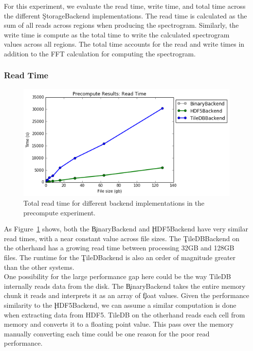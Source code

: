 For this experiment, we evaluate the read time, write time, and total time
across the different \c{StorageBackend} implementations. The read time is
calculated as the sum of all reads across regions when producing the
spectrogram. Similarly, the write time is compute as the total time to write
the calculated spectrogram values across all regions. The total time accounts
for the read and write times in addition to the FFT calculation for computing
the spectrogram.

\subsubsection{Read Time}

\begin{figure}[h]
\begin{center}
\includegraphics[scale=0.75]{./img/precompute-exp-read-time.png}
\caption{Total read time for different backend implementations in the
  precompute experiment.}
\label{fig:precompute-exp-read-time}
\end{center}
\end{figure}

As Figure~\ref{fig:precompute-exp-read-time} shows, both the \c{BinaryBackend}
and \c{HDF5Backend} have very similar read times, with a near constant value
across file sizes. The \c{TileDBBackend} on the otherhand has a growing read
time between processing 32GB and 128GB files. The runtime for the
\c{TileDBackend} is also an order of magnitude greater than the other systems. \\

One possibility for the large performance gap here could be the way TileDB
internally reads data from the disk. The \c{BinaryBackend} takes the entire
memory chunk it reads and interprets it as an array of \c{float} values. Given
the performance similarity to the \c{HDF5Backend}, we can assume a similar
computation is done when extracting data from HDF5. TileDB on the otherhand
reads each cell from memory and converts it to a floating point value. This
pass over the memory manually converting each time could be one reason for the
poor read performance.


